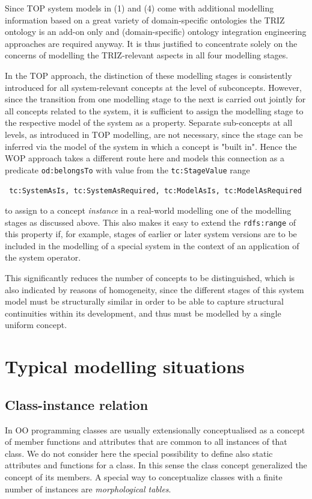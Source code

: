\documentclass[11pt,a4paper]{article}
\begin{document}
Since TOP system models in (1) and (4) come with additional modelling
information based on a great variety of domain-specific ontologies the TRIZ
ontology is an add-on only and (domain-specific) ontology integration
engineering approaches are required anyway. It is thus justified to
concentrate solely on the concerns of modelling the TRIZ-relevant aspects in
all four modelling stages.

In the TOP approach, the distinction of these modelling stages is consistently
introduced for all system-relevant concepts at the level of subconcepts.
However, since the transition from one modelling stage to the next is carried
out jointly for all concepts related to the system, it is sufficient to assign
the modelling stage to the respective model of the system as a property.
Separate sub-concepts at all levels, as introduced in TOP modelling, are not
necessary, since the stage can be inferred via the model of the system in
which a concept is "built in". Hence the WOP approach takes a different route
here and models this connection as a predicate \texttt{od:belongsTo} with
value from the \texttt{tc:StageValue} range
\begin{center}\tt
  tc:SystemAsIs, tc:SystemAsRequired, tc:ModelAsIs, tc:ModelAsRequired
\end{center}
to assign to a concept \emph{instance} in a real-world modelling one of the
modelling stages as discussed above.  This also makes it easy to extend the
\texttt{rdfs:range} of this property if, for example, stages of earlier or
later system versions are to be included in the modelling of a special system
in the context of an application of the system operator.

This significantly reduces the number of concepts to be distinguished, which
is also indicated by reasons of homogeneity, since the different stages of
this system model must be structurally similar in order to be able to capture
structural continuities within its development, and thus must be modelled by a
single uniform concept.

\section{Typical modelling situations}

\subsection{Class-instance relation}

In OO programming classes are usually extensionally conceptualised as a
concept of member functions and attributes that are common to all instances of
that class.  We do not consider here the special possibility to define also
static attributes and functions for a class.  In this sense the class concept
generalized the concept of its members.  A special way to conceptualize
classes with a finite number of instances are \emph{morphological tables}.
\end{document}
